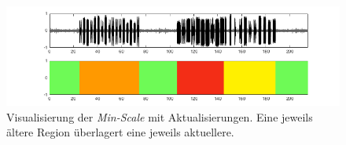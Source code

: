 \begin{itemize}
\begin{figure}[h]
	\centering
	\includegraphics[width=1\textwidth]{bilder/viz_act_under_02.png}
	\caption[Visualisierung der bei Aktualisierungen mit Priorisierung der vorangegangenen Schmerzbewertung]{Visualisierung der \emph{Min-Scale} mit Aktualisierungen. Eine jeweils \glqq ältere\grqq{} Region überlagert eine jeweils \glqq aktuellere\grqq{}.}
	\label{fig:viz_act_under}
\end{figure}
 
\end{itemize}
